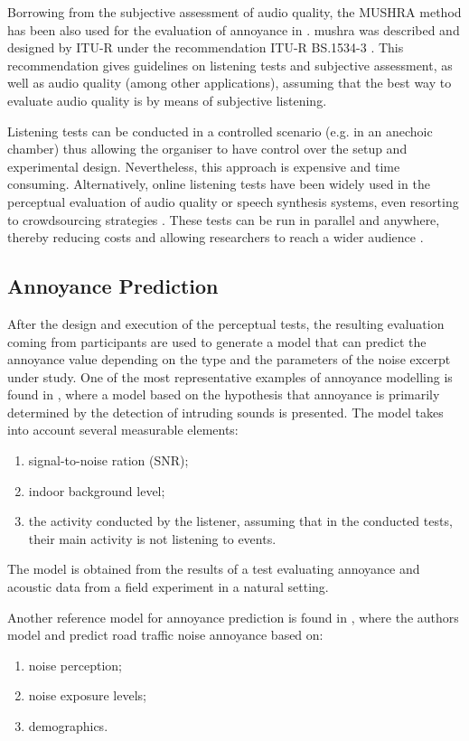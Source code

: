   Borrowing from the subjective assessment of audio quality, the MUSHRA method has been also used for the evaluation of annoyance in . \gls{mushra} was described and designed by ITU-R under the recommendation ITU-R BS.1534-3 . This recommendation gives guidelines on listening tests and subjective assessment, as well as audio quality (among other applications), assuming that the best way to evaluate audio quality is by means of subjective listening.

   Listening tests can be conducted in a controlled scenario (e.g. in an anechoic chamber) thus allowing the organiser to have control over the setup and experimental design. Nevertheless, this approach is expensive and time consuming. Alternatively, online listening tests have been widely used in the perceptual evaluation of audio quality or speech synthesis systems, even resorting to crowdsourcing strategies . These tests can be run in parallel and anywhere, thereby reducing costs and allowing researchers to reach a wider audience .

 \subsection{Annoyance Prediction}
   After the design and execution of the perceptual tests, the resulting evaluation coming from participants are used to generate a model that can predict the annoyance value depending on the type and the parameters of the noise excerpt under study. One of the most representative examples of annoyance modelling is found in , where a model based on the hypothesis that annoyance is primarily determined by the detection of intruding sounds is presented. The model takes into account several measurable elements:

   \begin{enumerate}
     \item signal-to-noise ration (SNR);
     \item indoor background level;
     \item the activity conducted by the listener, assuming that in the conducted tests, their main activity is not listening to events.
   \end{enumerate}

   The model is obtained from the results of a test evaluating annoyance and acoustic data from a field experiment in a natural setting.

   Another reference model for annoyance prediction is found in , where the authors model and predict road traffic noise annoyance based on:
   \begin{enumerate}
     \item noise perception;
     \item noise exposure levels;
     \item demographics.
   \end{enumerate}

